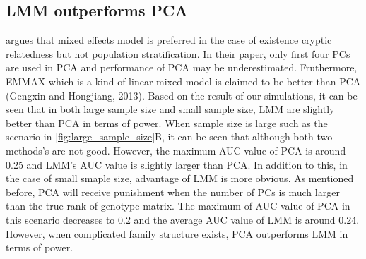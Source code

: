 \documentclass[12pt]{article}
\begin{document}
\subsection{LMM outperforms PCA }

\citet{wang_analytical_2013} argues that mixed effects model is preferred in the case of existence cryptic relatedness but not population stratification.
In their paper, only first four PCs are used in PCA and performance of PCA may be underestimated.
Fruthermore, EMMAX which is a kind of linear mixed model is claimed to be better than PCA (Gengxin and Hongjiang, 2013).
Based on the result of our simulations, it can be seen that in both large sample size and small sample size, LMM are slightly better than PCA in terms of power.
When sample size is large such as the scenario in \cref{fig:large_sample_size}B, it can be seen that although both two methods's are not good.
However, the maximum AUC value of PCA is around 0.25 and LMM's AUC value is slightly larger than PCA.
In addition to this, in the case of small smaple size, advantage of LMM is more obvious.
As mentioned before, PCA will receive punishment when the number of PCs is much larger than the true rank of genotype matrix.
The maximum of AUC value of PCA in this scenario decreases to 0.2 and the average AUC value of LMM is around 0.24.
However, when complicated family structure exists, PCA outperforms LMM in terms of power. 

\citep{tucker_improving_2014}

\printbibliography
\end{document}
